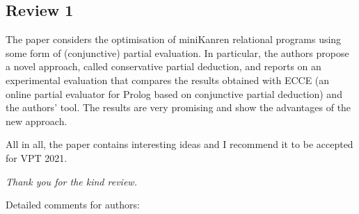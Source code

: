 
\subsection*{Review 1}

The paper considers the optimisation of miniKanren relational programs using some form of (conjunctive) partial evaluation. In particular, the authors propose a novel approach, called conservative partial deduction, and reports on an experimental evaluation that compares the results obtained with ECCE (an online partial evaluator for Prolog based on conjunctive partial deduction) and the authors' tool. The results are very promising and show the advantages of the new approach.

All in all, the paper contains interesting ideas and I recommend it to be accepted for VPT 2021.

\emph{Thank you for the kind review.}

Detailed comments for authors:


